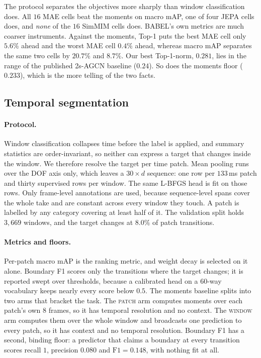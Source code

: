 The protocol separates the objectives more sharply than window classification does. All $16$ MAE
cells beat the moments on macro mAP, one of four JEPA cells does, and \emph{none} of the
$16$ SimMIM cells does. BABEL's own metrics are much coarser instruments. Against the
moments, Top-1 puts the best MAE cell only $5.6\%$ ahead and the worst MAE cell $0.4\%$
ahead, whereas macro mAP separates the same two cells by $20.7\%$ and $8.7\%$. Our best
Top-1-norm, $0.281$, lies in the range of the published 2s-AGCN baseline ($0.24$). So does
the moments floor ($0.233$), which is the more telling of the two facts.

\subsection{Temporal segmentation}
\label{sec:exp-segmentation}

\paragraph{Protocol.} Window classification collapses time before the label is applied,
and summary statistics are order-invariant, so neither can express a target that changes
inside the window. We therefore resolve the target per time patch. Mean pooling runs over
the DOF axis only, which leaves a $30\times d$ sequence: one row per $133$\,ms patch and
thirty supervised rows per window. The same L-BFGS head is fit on those rows. Only
frame-level annotations are used, because sequence-level spans cover the whole take and are
constant across every window they touch. A patch is labelled by any category covering at
least half of it. The validation split holds $3{,}669$ windows, and the target changes at
$8.0\%$ of patch transitions.

\paragraph{Metrics and floors.} Per-patch macro mAP is the ranking metric, and weight decay
is selected on it alone. Boundary F1 scores only the transitions where the target changes;
it is reported swept over thresholds, because a calibrated head on a $60$-way vocabulary
keeps nearly every score below $0.5$. The moments baseline splits into two arms that
bracket the task. The \textsc{patch} arm computes moments over each patch's own $8$ frames,
so it has temporal resolution and no context. The \textsc{window} arm computes them over the
whole window and broadcasts one prediction to every patch, so it has context and no temporal
resolution. Boundary F1 has a second, binding floor: a predictor that claims a boundary at
every transition scores recall $1$, precision $0.080$ and $\text{F1}=0.148$, with nothing
fit at all.

